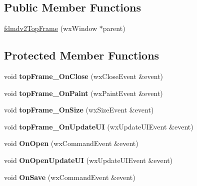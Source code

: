 \subsection*{Public Member Functions}
\begin{DoxyCompactItemize}
\item 
\hyperlink{classfdmdv2_top_frame_a1f0ad87f5fbbc72f700fa741a4596d84}{fdmdv2\-Top\-Frame} (wx\-Window $\ast$parent)
\end{DoxyCompactItemize}
\subsection*{Protected Member Functions}
\begin{DoxyCompactItemize}
\item 
\hypertarget{classfdmdv2_top_frame_a75758da26b9f1d4d95a4756d804d090b}{void {\bfseries top\-Frame\-\_\-\-On\-Close} (wx\-Close\-Event \&event)}\label{classfdmdv2_top_frame_a75758da26b9f1d4d95a4756d804d090b}

\item 
\hypertarget{classfdmdv2_top_frame_a6fe062b45e4e7f3323eb72ef931807df}{void {\bfseries top\-Frame\-\_\-\-On\-Paint} (wx\-Paint\-Event \&event)}\label{classfdmdv2_top_frame_a6fe062b45e4e7f3323eb72ef931807df}

\item 
\hypertarget{classfdmdv2_top_frame_a7bd457c44e334b8d59a48a844942866d}{void {\bfseries top\-Frame\-\_\-\-On\-Size} (wx\-Size\-Event \&event)}\label{classfdmdv2_top_frame_a7bd457c44e334b8d59a48a844942866d}

\item 
\hypertarget{classfdmdv2_top_frame_a6631bc79dc08dc55da9daadd6c8d1531}{void {\bfseries top\-Frame\-\_\-\-On\-Update\-U\-I} (wx\-Update\-U\-I\-Event \&event)}\label{classfdmdv2_top_frame_a6631bc79dc08dc55da9daadd6c8d1531}

\item 
\hypertarget{classfdmdv2_top_frame_a38ca5d4d0de386fbd0bb097c472084e6}{void {\bfseries On\-Open} (wx\-Command\-Event \&event)}\label{classfdmdv2_top_frame_a38ca5d4d0de386fbd0bb097c472084e6}

\item 
\hypertarget{classfdmdv2_top_frame_a053681a1faa59f4c4617f02d7ba1d583}{void {\bfseries On\-Open\-Update\-U\-I} (wx\-Update\-U\-I\-Event \&event)}\label{classfdmdv2_top_frame_a053681a1faa59f4c4617f02d7ba1d583}

\item 
\hypertarget{classfdmdv2_top_frame_a00c49f4b14481582e60b83a041d1aea7}{void {\bfseries On\-Save} (wx\-Command\-Event \&event)}\label{classfdmdv2_top_frame_a00c49f4b14481582e60b83a041d1aea7}


\end{DoxyCompactItemize}
